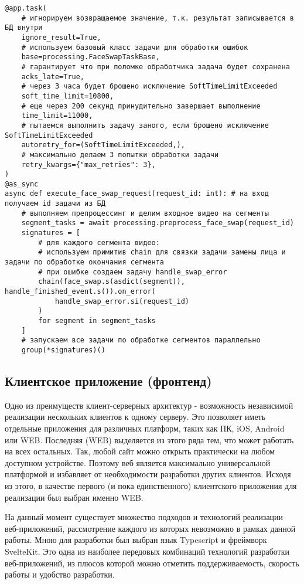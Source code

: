 \begin{lstlisting}
@app.task(
    # игнорируем возвращаемое значение, т.к. результат записывается в БД внутри
    ignore_result=True,
    # используем базовый класс задачи для обработки ошибок
    base=processing.FaceSwapTaskBase,
    # гарантирует что при поломке обработчика задача будет сохранена
    acks_late=True,
    # через 3 часа будет брошено исключение SoftTimeLimitExceeded
    soft_time_limit=10800,
    # еще через 200 секунд принудительно завершает выполнение
    time_limit=11000,
    # пытаемся выполнить задачу заного, если брошено исключение SoftTimeLimitExceeded
    autoretry_for=(SoftTimeLimitExceeded,),
    # максимально делаем 3 попытки обработки задачи
    retry_kwargs={"max_retries": 3},
)
@as_sync
async def execute_face_swap_request(request_id: int): # на вход получаем id задачи из БД
    # выполняем препроцессинг и делим входное видео на сегменты
    segment_tasks = await processing.preprocess_face_swap(request_id)
    signatures = [
        # для каждого сегмента видео:
        # используем примитив chain для связки задачи замены лица и задачи по обработке окончания сегмента
        # при ошибке создаем задачу handle_swap_error
        chain(face_swap.s(asdict(segment)), handle_finished_event.s()).on_error(
            handle_swap_error.si(request_id)
        )
        for segment in segment_tasks
    ]
    # запускаем все задачи по обработке сегментов параллельно
    group(*signatures)()
\end{lstlisting}

\subsection{Клиентское приложение (фронтенд)}

Одно из преимуществ клиент-серверных архитектур - возможность независимой реализации нескольких клиентов к одному серверу. Это позволяет иметь отдельные приложения для различных платформ, таких как ПК, iOS, Android или WEB. Последняя (WEB) выделяется из этого ряда тем, что может работать на всех остальных. Так, любой сайт можно открыть практически на любом доступном устройстве. Поэтому веб является максимально универсальной платформой и избавляет от необходимости разработки других клиентов. Исходя из этого, в качестве первого (и пока единственного) клиентского приложения для реализации был выбран именно WEB.

На данный момент существует множество подходов и технологий реализации веб-приложений, рассмотрение каждого из которых невозможно в рамках данной работы. Мною для разработки был выбран язык Typescript и фреймворк SvelteKit\cite{sveltekit_website}. Это одна из наиболее передовых комбинаций технологий разработки веб-приложений, из плюсов которой можно отметить поддерживаемость, скорость работы и удобство разработки.

